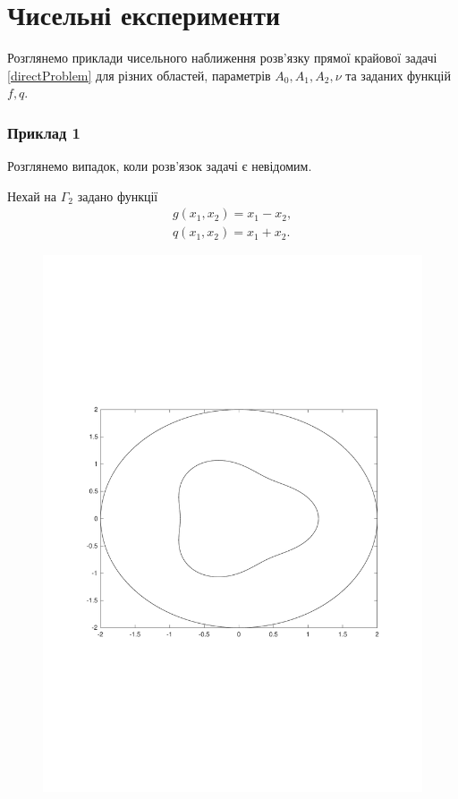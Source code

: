 \documentclass[12pt]{report}
\begin{document}
\chapter{Чисельні експерименти}

Розглянемо приклади чисельного наближення розв'язку прямої крайової задачі \eqref{directProblem} для різних областей, параметрів $A_0,A_1,A_2,\nu$ та заданих функцій $f, q$.

\subsection{Приклад 1}
Розглянемо випадок, коли розв'язок задачі є невідомим.

Нехай на $\Gamma_2$ задано функції
  \begin{gather*}
	g(x_1, x_2) = x_1-x_2,\\
	q(x_1, x_2) = x_1 +x_2.
 \end{gather*}
 
 \begin{figure}[h!]
\centering
	\vspace*{-4.5cm}
	\includegraphics[scale=.5]{sample1.pdf}
	\vspace*{-4cm}
\end{figure}
\end{document}
